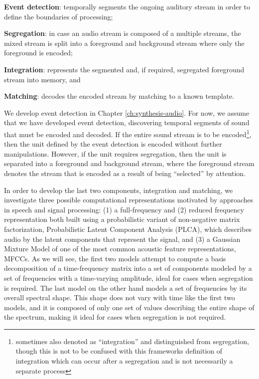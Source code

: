 \documentclass[a4paper,10pt,final]{ThesisStyle}
\begin{document}
\begin{enumerateb}
\item \textbf{Event detection}: temporally segments the ongoing auditory stream in order to define the boundaries of processing; 
\item \textbf{Segregation}: in case an audio stream is composed of a multiple streams, the mixed stream is split into a foreground and background stream where only the foreground is encoded; 
\item \textbf{Integration}: represents the segmented and, if required, segregated foreground stream into memory, and 
\item \textbf{Matching}: decodes the encoded stream by matching to a known template.
\end{enumerateb}

We develop event detection in Chapter \ref{ch:synthesis-audio}.  For now, we assume that we have developed event detection, discovering temporal segments of sound that must be encoded and decoded.  If the entire sound stream is to be encoded\footnote{sometimes also denoted as ``integration'' and distinguished from segregation, though this is not to be confused with this frameworks definition of integration which can occur after a segregation and is not necessarily a separate process}, then the unit defined by the event detection is encoded without further manipulations. However, if the unit requires segregation, then the unit is separated into a foreground and background stream, where the foreground stream denotes the stream that is encoded as a result of being ``selected'' by attention.  

In order to develop the last two components, integration and matching, we investigate three possible computational representations motivated by approaches in speech and signal processing: (1) a full-frequency and (2) reduced frequency representation both built using a probabilistic variant of non-negative matrix factorization, Probabilistic Latent Component Analysis (PLCA), which describes audio by the latent components that represent the signal, and (3) a Gaussian Mixture Model of one of the most common acoustic feature representations, MFCCs.  As we will see, the first two models attempt to compute a basis decomposition of a time-frequency matrix into a set of components modeled by a set of frequencies with a time-varying amplitude, ideal for cases when segregation is required.  The last model on the other hand models a set of frequencies by its overall spectral shape.  This shape does not vary with time like the first two models, and it is composed of only one set of values describing the entire shape of the spectrum, making it ideal for cases when segregation is not required.
\end{document}
